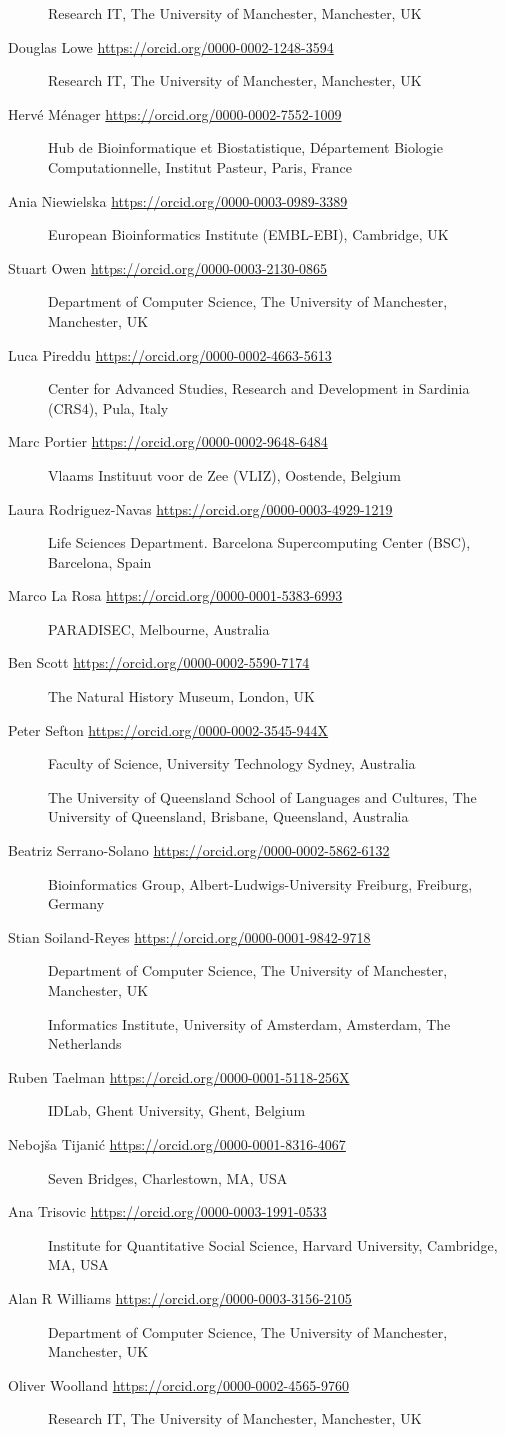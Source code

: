 \begin{description}
Research IT, The University of Manchester, Manchester, UK
\item[Douglas Lowe \url{https://orcid.org/0000-0002-1248-3594}]
Research IT, The University of Manchester, Manchester, UK
\item[Hervé Ménager \url{https://orcid.org/0000-0002-7552-1009}]
Hub de Bioinformatique et Biostatistique, Département Biologie
Computationnelle, Institut Pasteur, Paris, France
\item[Ania Niewielska \url{https://orcid.org/0000-0003-0989-3389}]
European Bioinformatics Institute (EMBL-EBI), Cambridge, UK
\item[Stuart Owen \url{https://orcid.org/0000-0003-2130-0865}]
Department of Computer Science, The University of Manchester,
Manchester, UK
\item[Luca Pireddu \url{https://orcid.org/0000-0002-4663-5613}]
Center for Advanced Studies, Research and Development in Sardinia
(CRS4), Pula, Italy
\item[Marc Portier \url{https://orcid.org/0000-0002-9648-6484}]
Vlaams Instituut voor de Zee (VLIZ), Oostende, Belgium
\item[Laura Rodriguez-Navas \url{https://orcid.org/0000-0003-4929-1219}]
Life Sciences Department. Barcelona Supercomputing Center (BSC),
Barcelona, Spain
\item[Marco La Rosa \url{https://orcid.org/0000-0001-5383-6993}]
PARADISEC, Melbourne, Australia
\item[Ben Scott \url{https://orcid.org/0000-0002-5590-7174}]
The Natural History Museum, London, UK
\item[Peter Sefton \url{https://orcid.org/0000-0002-3545-944X}]
Faculty of Science, University Technology Sydney, Australia

The University of Queensland School of Languages and Cultures, The
University of Queensland, Brisbane, Queensland, Australia
\item[Beatriz Serrano-Solano
\url{https://orcid.org/0000-0002-5862-6132}]
Bioinformatics Group, Albert-Ludwigs-University Freiburg, Freiburg,
Germany
\item[Stian Soiland-Reyes \url{https://orcid.org/0000-0001-9842-9718}]
Department of Computer Science, The University of Manchester,
Manchester, UK

Informatics Institute, University of Amsterdam, Amsterdam, The
Netherlands
\item[Ruben Taelman \url{https://orcid.org/0000-0001-5118-256X}]
IDLab, Ghent University, Ghent, Belgium
\item[Nebojša Tijanić \url{https://orcid.org/0000-0001-8316-4067}]
Seven Bridges, Charlestown, MA, USA
\item[Ana Trisovic \url{https://orcid.org/0000-0003-1991-0533}]
Institute for Quantitative Social Science, Harvard University,
Cambridge, MA, USA
\item[Alan R Williams \url{https://orcid.org/0000-0003-3156-2105}]
Department of Computer Science, The University of Manchester,
Manchester, UK
\item[Oliver Woolland \url{https://orcid.org/0000-0002-4565-9760}]
Research IT, The University of Manchester, Manchester, UK
\end{description}

